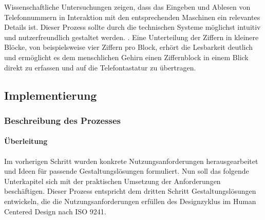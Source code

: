 \documentclass[12pt]{article}
\begin{document}
Wissenschaftliche Untersuchungen zeigen, dass das Eingeben und Ablesen von
Telefonnummern in Interaktion mit den entsprechenden Maschinen ein relevantes
Details ist. Dieser Prozess sollte durch die technischen Systeme möglichst
intuitiv und nutzerfreundlich gestaltet werden. \cite{humCompPhoneNumbers}.
Eine Unterteilung der Ziffern in kleinere Blöcke, von beispielsweise vier
Ziffern pro Block, erhört die Lesbarkeit deutlich und ermöglicht es dem
menschlichen Gehirn einen Ziffernblock in einem Blick direkt zu erfassen und
auf die Telefontastatur zu übertragen. \cite{phoneFormatBlog}
\cite{numberRecognition} \cite{numberRepres}

\subsection{Implementierung}
\subsubsection{Beschreibung des Prozesses}

\paragraph{Überleitung}
Im vorherigen Schritt wurden konkrete Nutzungsanforderungen herausgearbeitet
und Ideen für passende Gestaltungslösungen formuliert. Nun soll das folgende
Unterkapitel sich mit der praktischen Umsetzung der Anforderungen beschäftigen.
Dieser Prozess entspricht dem dritten Schritt \glqq{}Gestaltungslösungen
entwickeln, die die Nutzungsanforderungen erfüllen\grqq{} des Designzyklus im
Human Centered Design nach ISO 9241\cite{iso9241}.
\end{document}
